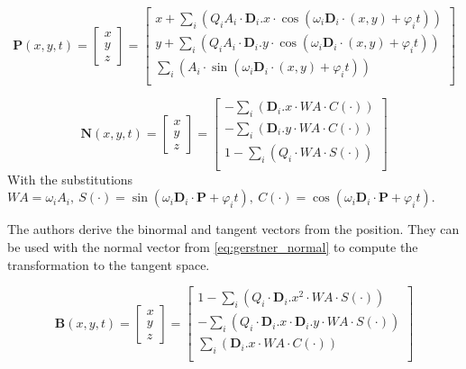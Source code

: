 \begin{equation}\label{eq:gerstner_position}
    \textbf{P}(x,y,t)=\begin{bmatrix}x\\ y\\ z\end{bmatrix}=\begin{bmatrix} x +
    \sum_{i}(Q_i A_i\cdot\textbf{D}_i.x\cdot \cos(\omega_i \textbf{D}_i\cdot
    (x,y) + \varphi_i t))\\ y + \sum_{i}(Q_i A_i\cdot\textbf{D}_i.y\cdot
    \cos(\omega_i \textbf{D}_i\cdot (x,y) + \varphi_i t))\\ \sum_{i}(A_i\cdot
\sin(\omega_i \textbf{D}_i\cdot (x,y) + \varphi_i t))\\\end{bmatrix}
\end{equation}

\begin{equation}\label{eq:gerstner_normal}
    \textbf{N}(x,y,t)=\begin{bmatrix}x\\ y\\ z\end{bmatrix}=\begin{bmatrix}
    - \sum_{i}(\textbf{D}_i.x\cdot WA \cdot C(\cdot))\\ 
    - \sum_{i}(\textbf{D}_i.y\cdot WA \cdot C(\cdot))\\ 
    1-\sum_{i}(Q_i \cdot WA \cdot S(\cdot))\\\end{bmatrix}
\end{equation}
%
With the substitutions $WA = \omega_i A_i,\ S(\cdot) = \sin(\omega_i
\textbf{D}_i \cdot \textbf{P} + \varphi_i t),\ C(\cdot) = \cos(\omega_i
\textbf{D}_i \cdot \textbf{P} + \varphi_i t)$.

The authors derive the binormal and tangent vectors from the position. They can
be used with the normal vector from \autoref{eq:gerstner_normal} to compute the
transformation to the tangent space.

\begin{equation}\label{eq:gerstner_binormal}
    \textbf{B}(x,y,t)=\begin{bmatrix}x\\ y\\ z\end{bmatrix}=\begin{bmatrix}
    1 - \sum_{i}(Q_i \cdot \textbf{D}_i.x^2 \cdot WA \cdot S(\cdot))\\
    - \sum_{i}(Q_i \cdot \textbf{D}_i.x \cdot \textbf{D}_i.y\cdot WA \cdot
    S(\cdot))\\ 
    \sum_{i}(\textbf{D}_i.x \cdot WA \cdot C(\cdot))\\\end{bmatrix}
\end{equation}

